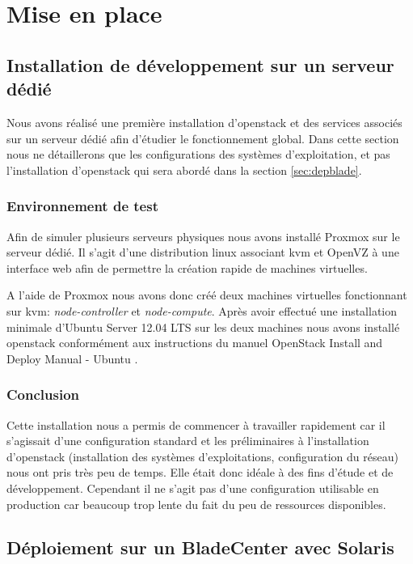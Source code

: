 \documentclass[a4paper,oneside]{report}
\begin{document}
\chapter{Mise en place} \label{cha:miseenplace}
\section{Installation de développement sur un serveur dédié}
Nous avons réalisé une première installation d'\gls{openstack} et des services associés sur un serveur dédié afin d'étudier le fonctionnement global.
Dans cette section nous ne détaillerons que les configurations des systèmes d'exploitation, et pas l'installation d'\gls{openstack} qui sera abordé dans la section \ref{sec:depblade}.

\subsection{Environnement de test}
Afin de simuler plusieurs serveurs physiques nous avons installé Proxmox sur le serveur dédié. Il s'agit d'une distribution \gls{linux} associant \gls{kvm} et OpenVZ à une interface web afin de permettre la création rapide de machines virtuelles.

A l'aide de Proxmox nous avons donc créé deux machines virtuelles fonctionnant sur \gls{kvm}: \emph{node-controller} et \emph{node-compute}. Après avoir effectué une installation minimale d'Ubuntu Server 12.04 LTS sur les deux machines nous avons installé \gls{openstack} conformément aux instructions du manuel \og OpenStack Install and Deploy Manual - Ubuntu \fg \cite{OSFolsomInstallUbuntu1210}.

\subsection{Conclusion}
Cette installation nous a permis de commencer à travailler rapidement car il s'agissait d'une configuration standard et les préliminaires à l'installation d'\gls{openstack} (installation des systèmes d'exploitations, configuration du réseau) nous ont pris très peu de temps.
Elle était donc idéale à des fins d'étude et de développement.\newline
Cependant il ne s'agit pas d'une configuration utilisable en production car beaucoup trop lente du fait du peu de ressources disponibles.

\section{Déploiement sur un BladeCenter avec Solaris} \label{sec:depsolaris}
\end{document}
